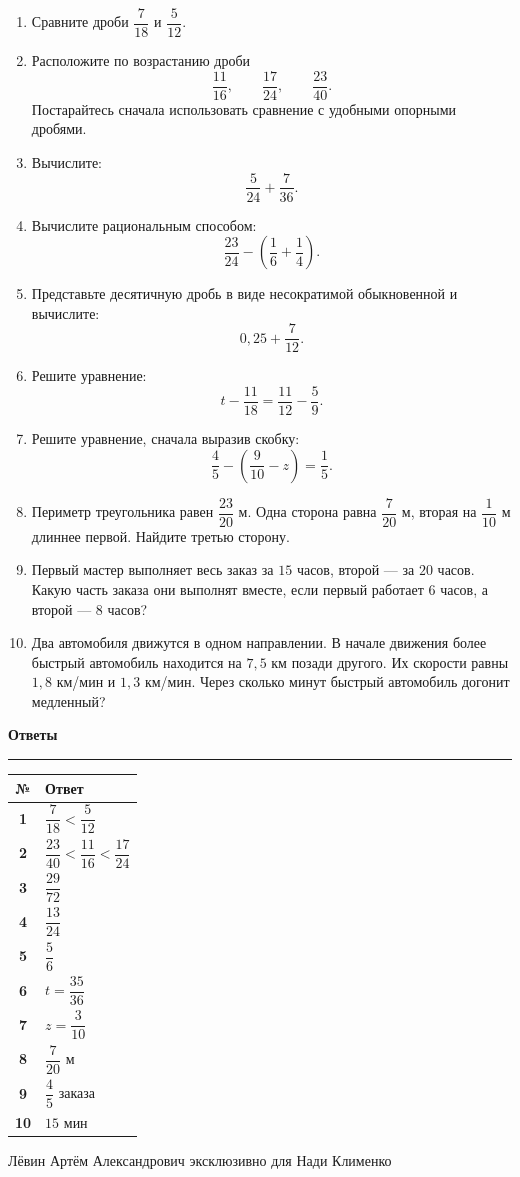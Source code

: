 \documentclass[a4paper,12pt]{article}
\newcommand{\sectiontitle}[1]{%
  \vspace{0.7em}
  {\large\bfseries\color{darkaccent}#1}\par
  \vspace{0.2em}\color{linegray}\hrule\color{textgray}\vspace{0.55em}
}
\begin{document}
\begin{enumerate}
  \item Сравните дроби \(\dfrac7{18}\) и \(\dfrac5{12}\).

  \item Расположите по возрастанию дроби
  \[
  \frac{11}{16},\qquad \frac{17}{24},\qquad \frac{23}{40}.
  \]
  Постарайтесь сначала использовать сравнение с удобными опорными дробями.

  \item Вычислите:
  \[
  \frac5{24}+\frac7{36}.
  \]

  \item Вычислите рациональным способом:
  \[
  \frac{23}{24}-\left(\frac16+\frac14\right).
  \]

  \item Представьте десятичную дробь в виде несократимой обыкновенной и вычислите:
  \[
  0{,}25+\frac7{12}.
  \]

  \item Решите уравнение:
  \[
  t-\frac{11}{18}=\frac{11}{12}-\frac59.
  \]

  \item Решите уравнение, сначала выразив скобку:
  \[
  \frac45-\left(\frac9{10}-z\right)=\frac15.
  \]

  \item Периметр треугольника равен \(\dfrac{23}{20}\) м. Одна сторона равна \(\dfrac7{20}\) м, вторая на \(\dfrac1{10}\) м длиннее первой. Найдите третью сторону.

  \item Первый мастер выполняет весь заказ за \(15\) часов, второй --- за \(20\) часов. Какую часть заказа они выполнят вместе, если первый работает \(6\) часов, а второй --- \(8\) часов?

  \item Два автомобиля движутся в одном направлении. В начале движения более быстрый автомобиль находится на \(7{,}5\) км позади другого. Их скорости равны \(1{,}8\) км/мин и \(1{,}3\) км/мин. Через сколько минут быстрый автомобиль догонит медленный?
\end{enumerate}

\clearpage
\sectiontitle{Ответы}

\renewcommand{\arraystretch}{1.45}
\begin{tabularx}{\linewidth}{>{\bfseries}c X}
\toprule
№ & Ответ \\
\midrule
1 & \(\dfrac7{18}<\dfrac5{12}\) \\
2 & \(\dfrac{23}{40}<\dfrac{11}{16}<\dfrac{17}{24}\) \\
3 & \(\dfrac{29}{72}\) \\
4 & \(\dfrac{13}{24}\) \\
5 & \(\dfrac56\) \\
6 & \(t=\dfrac{35}{36}\) \\
7 & \(z=\dfrac3{10}\) \\
8 & \(\dfrac7{20}\text{ м}\) \\
9 & \(\dfrac45\) заказа \\
10 & \(15\text{ мин}\) \\
\bottomrule
\end{tabularx}

\vfill
{\small\color{softgray} Лёвин Артём Александрович эксклюзивно для Нади Клименко}
\end{document}
